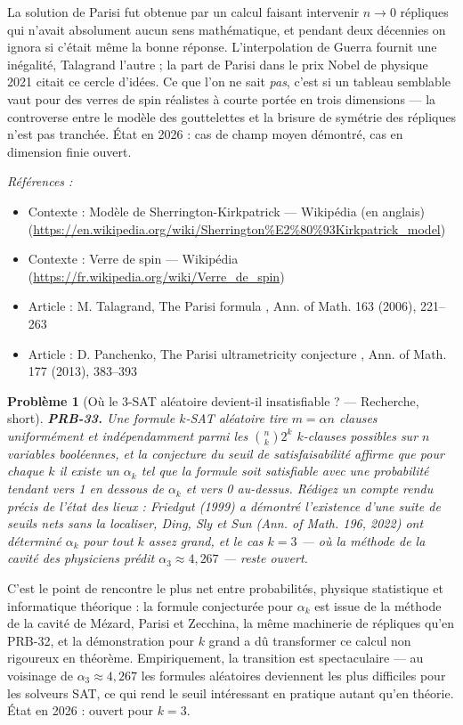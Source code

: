 \documentclass[11pt]{article}
\newtheorem{problem}{Problème}
\newenvironment{refs}{\par\small\noindent\emph{Références :}\begin{itemize}\setlength\itemsep{0pt}}{\end{itemize}\normalsize}
\begin{document}
\noindent La solution de Parisi fut obtenue par un calcul faisant intervenir
\og{} $ n \to 0 $ répliques \fg{} qui n'avait absolument aucun sens mathématique, et pendant deux
décennies on ignora si c'était même la bonne réponse. L'interpolation de Guerra fournit une
inégalité, Talagrand l'autre ; la part de Parisi dans le prix Nobel de physique 2021 citait ce
cercle d'idées. Ce que l'on ne sait \textit{pas}, c'est si un tableau semblable vaut pour des verres
de spin réalistes à courte portée en trois dimensions --- la controverse entre le modèle des
gouttelettes et la brisure de symétrie des répliques n'est pas tranchée. État en 2026 : cas de
champ moyen démontré, cas en dimension finie ouvert.

\begin{refs}
\item Contexte : Modèle de Sherrington-Kirkpatrick --- Wikipédia (en anglais) (\url{https://en.wikipedia.org/wiki/Sherrington%E2%80%93Kirkpatrick_model})
\item Contexte : Verre de spin --- Wikipédia (\url{https://fr.wikipedia.org/wiki/Verre_de_spin})
\item Article : M. Talagrand, \og{} The Parisi formula \fg{}, Ann. of Math. 163 (2006), 221--263
\item Article : D. Panchenko, \og{} The Parisi ultrametricity conjecture \fg{}, Ann. of Math. 177 (2013), 383--393
\end{refs}

\bigskip

\begin{problem}[{Où le 3-SAT aléatoire devient-il insatisfiable ? --- Recherche, short}]
\textbf{PRB-33.} Une formule $ k $-SAT aléatoire tire $ m = \alpha n $
clauses uniformément et indépendamment parmi les $ \binom{n}{k} 2^k $ $ k $-clauses possibles
sur $ n $ variables booléennes, et la conjecture du seuil de satisfaisabilité affirme que pour
chaque $ k $ il existe un $ \alpha_k $ tel que la formule soit satisfiable avec une probabilité
tendant vers 1 en dessous de $ \alpha_k $ et vers 0 au-dessus. Rédigez un compte rendu précis de
l'état des lieux : Friedgut (1999) a démontré l'existence d'une \textit{suite} de seuils nets sans la
localiser, Ding, Sly et Sun (Ann. of Math. 196, 2022) ont déterminé $ \alpha_k $ pour tout $ k $
assez grand, et le cas $ k = 3 $ --- où la méthode de la cavité des physiciens prédit
$ \alpha_3 \approx 4{,}267 $ --- reste ouvert.
\end{problem}

\noindent C'est le point de rencontre le plus net entre probabilités, physique statistique
et informatique théorique : la formule conjecturée pour $ \alpha_k $ est issue de la méthode de
la cavité de Mézard, Parisi et Zecchina, la même machinerie de répliques qu'en PRB-32, et la
démonstration pour $ k $ grand a dû transformer ce calcul non rigoureux en théorème.
Empiriquement, la transition est spectaculaire --- au voisinage de $ \alpha_3 \approx 4{,}267 $ les
formules aléatoires deviennent les plus difficiles pour les solveurs SAT, ce qui rend le seuil
intéressant en pratique autant qu'en théorie. État en 2026 : ouvert pour $ k = 3 $.
\end{document}

